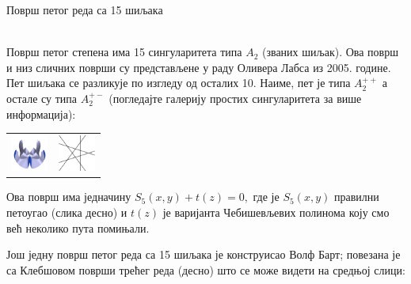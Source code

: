 \documentclass[sr]{./../../common/SurferDesc}%
\begin{document}
\footnotesize




\begin{surferPage}
  \begin{surferTitle}Површ петог реда са 15 шиљака\end{surferTitle}   \\
  Површ петог степена има 15 сингуларитета типа $A_2$
    (званих шиљак). Ова површ и низ сличних површи су представљене у  раду Оливера 
	Лабса из 2005. године.
    Пет шиљака се разликује по изгледу од осталих 10.
    Наиме, пет је типа $A_2^{++}$ а остале су типа $A_2^{+-}$ (погледајте галерију 
	простих сингуларитета за више информација):

     \vspace*{-0.3em}
    \begin{center}
      \begin{tabular}{c@{\qquad}c}
        \includegraphics[height=1.2cm]{./../../common/images/dessins_quint_15a2}
        &
        \includegraphics[height=1.2cm]{./../../common/images/rp5.pdf}
      \end{tabular}
    \end{center}
    \vspace*{-0.3em}    
    
    Ова површ има једначину  
    $S_5(x,y) + t(z)=0,$
    где је $S_5(x,y)$ правилни петоугао (слика десно) и $t(z)$ је варијанта 
	Чебишевљевих полинома коју смо већ неколико пута помињали.

     Још једну површ петог реда са 15 шиљака је конструисао Волф Барт; 
	 повезана је са Клебшовом површи трећег реда (десно) што се може видети на средњој слици:


\end{surferPage}
\end{document}
